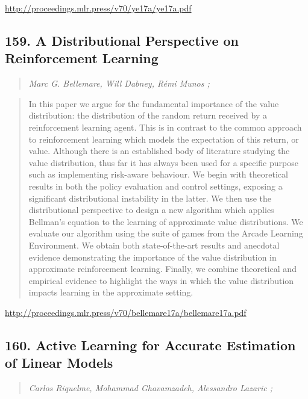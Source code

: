 \documentclass{article}
\begin{document}
\href{http://proceedings.mlr.press/v70/ye17a/ye17a.pdf}{http://proceedings.mlr.press/v70/ye17a/ye17a.pdf}

\subsection{159. A Distributional Perspective on Reinforcement Learning}

\begin{quote}
\footnotesize{\textit{Marc G. Bellemare, Will Dabney, Rémi Munos ;}}
\end{quote}

\begin{quote}
    In this paper we argue for the fundamental importance of the value distribution: the distribution of the random return received by a reinforcement learning agent. This is in contrast to the common approach to reinforcement learning which models the expectation of this return, or value. Although there is an established body of literature studying the value distribution, thus far it has always been used for a specific purpose such as implementing risk-aware behaviour. We begin with theoretical results in both the policy evaluation and control settings, exposing a significant distributional instability in the latter. We then use the distributional perspective to design a new algorithm which applies Bellman’s equation to the learning of approximate value distributions. We evaluate our algorithm using the suite of games from the Arcade Learning Environment. We obtain both state-of-the-art results and anecdotal evidence demonstrating the importance of the value distribution in approximate reinforcement learning. Finally, we combine theoretical and empirical evidence to highlight the ways in which the value distribution impacts learning in the approximate setting.  \end{quote}

\href{http://proceedings.mlr.press/v70/bellemare17a/bellemare17a.pdf}{http://proceedings.mlr.press/v70/bellemare17a/bellemare17a.pdf}

\subsection{160. Active Learning for Accurate Estimation of Linear Models}

\begin{quote}
\footnotesize{\textit{Carlos Riquelme, Mohammad Ghavamzadeh, Alessandro Lazaric ;}}
\end{quote}
\end{document}
